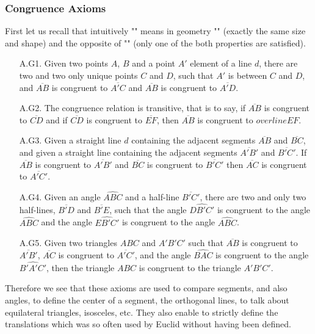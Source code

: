 	\pagebreak
	\subsubsection{Congruence Axioms}
	First let us recall that intuitively "" means in geometry "" (exactly the same size and shape) and the opposite of "" (only one of the both properties are satisfied).
	
	\begin{enumerate}
		\item[A.G1.] Given two points $A$, $B$ and a point $A'$ element of a line $d$, there are two and two only unique points $C$ and $D$, such that $A'$ is between $C$ and $D$, and $\overline{AB}$ is congruent to $\overline{A'C}$ and $\overline{AB}$ is congruent to $\overline{A'D}$.
	
		\item[A.G2.] The congruence relation is transitive, that is to say, if $\overline{AB}$ is congruent to $\overline{CD}$ and if $\overline{CD}$ is congruent to $\overline{EF}$, then $\overline{AB}$ is congruent to $overline{EF}$.	

		\item[A.G3.] Given a straight line $d$ containing the adjacent segments $\overline{AB}$ and $\overline{BC}$, and given a straight line containing the adjacent segments $\overline{A'B'}$ and $\overline{B'C'}$. If $\overline{AB}$ is congruent to $\overline{A'B'}$ and $\overline{BC}$ is congruent to $\overline{B'C'}$ then $\overline{AC}$ is congruent to $\overline{A'C'}$.	

		\item[A.G4.] Given an angle $\widehat{ABC}$ and a half-line $\overline{B'C'}$, there are two and only two half-lines, $\overline{B'D}$ and $\overline{B'E}$, such that the angle $\widehat{DB'C'}$ is congruent to the angle $\widehat{ABC}$ and the angle $\widehat{EB'C'}$ is congruent to the angle $\widehat{ABC}$.
 	
		\item[A.G5.] Given two triangles $ABC$ and $A'B'C'$ such that $\overline{AB}$ is congruent to $\overline{A'B'}$, $\overline{AC}$ is congruent to $\overline{A'C'}$, and the angle $\widehat{BAC}$ is congruent to the angle $\widehat{B'A'C'}$, then the triangle $ABC$ is congruent to the triangle $A'B'C'$.
	\end{enumerate}
	Therefore we see that these axioms are used to compare segments, and also angles, to define the center of a segment, the orthogonal lines, to talk about equilateral triangles, isosceles, etc. They also enable to strictly define the translations which was so often used by Euclid without having been defined.


